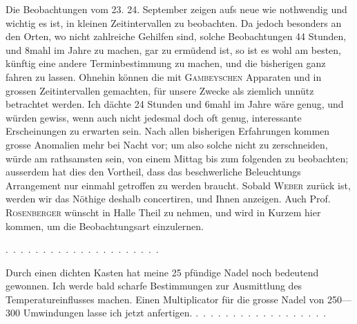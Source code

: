 Die Beobachtungen vom 23. 24. September zeigen aufs neue wie nothwendig
und wichtig es ist, in kleinen Zeitintervallen zu beobachten. Da jedoch
besonders an den Orten, wo nicht zahlreiche Gehilfen sind, solche Beobachtungen
44 Stunden, und 8mahl im Jahre zu machen, gar zu ermüdend
ist, so ist es wohl am besten, künftig eine andere Terminbestimmung zu
machen, und die bisherigen ganz fahren zu lassen. Ohnehin können die mit
\textsc{Gambeyschen} Apparaten und in grossen Zeitintervallen gemachten, für unsere
Zwecke als ziemlich unnütz betrachtet werden. Ich dächte 24 Stunden und
6mahl im Jahre wäre genug, und würden gewiss, wenn auch nicht jedesmal
doch oft genug, interessante Erscheinungen zu erwarten sein. Nach allen bisherigen
Erfahrungen kommen grosse Anomalien mehr bei Nacht vor; um also
solche nicht zu zerschneiden, würde am rathsamsten sein, von einem Mittag
bis zum folgenden zu beobachten; ausserdem hat dies den Vortheil, dass das
beschwerliche Beleuchtungs Arrangement nur einmahl getroffen zu werden
braucht. Sobald \textsc{Weber} zurück ist, werden wir das Nöthige deshalb concertiren,
und Ihnen anzeigen. Auch Prof. \textsc{Rosenberger} wünscht in Halle Theil
zu nehmen, und wird in Kurzem hier kommen, um die Beobachtungsart
einzulernen.
\par\noindent .\ .\ .\ .\ .\ .\ .\ .\ .\ .\ .\ .\ .\ .\ .\ .\ .\ .\ .\ .\ .
\par\noindent\hspace*{\parindent}Durch einen dichten Kasten hat meine 25 pfündige Nadel noch bedeutend
gewonnen. Ich werde bald scharfe Bestimmungen zur Ausmittlung des Temperatureinflusses
machen. Einen Multiplicator für die grosse Nadel von 250---300 Umwindungen lasse ich jetzt anfertigen. \mbox{.\ .\ .\ .\ .\ .\ .\ .\ .\ .\ .\ .\ .\ .\ .\ .\ .\ .\ }
\clearpage\endgroup
